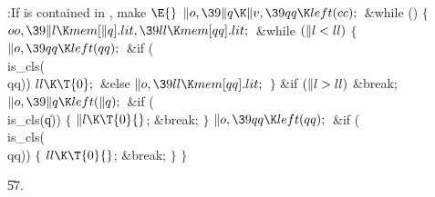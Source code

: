 \Y\B\4:If  is contained in , make %
\X${}\E{}$\6
$\|o,\39\|q\K\|v,\39\\{qq}\K\\{left}(\\{cc});{}$\6
\&{while} ()\5
${}\{{}$\1\6
${}\\{oo},\39\|l\K\\{mem}[\|q].\\{lit},\39\\{ll}\K\\{mem}[\\{qq}].\\{lit};{}$\6
\&{while} ${}(\|l<\\{ll}){}$\5
${}\{{}$\1\6
${}\|o,\39\\{qq}\K\\{left}(\\{qq});{}$\6
\&{if} (\\{is\_cls}(\\{qq}))\1\5
${}\\{ll}\K\T{0};{}$\2\6
\&{else}\1\5
${}\|o,\39\\{ll}\K\\{mem}[\\{qq}].\\{lit};{}$\2\6
\4${}\}{}$\2\6
\&{if} ${}(\|l>\\{ll}){}$\1\5
\&{break};\2\6
${}\|o,\39\|q\K\\{left}(\|q);{}$\6
\&{if} (\\{is\_cls}(\|q))\5
${}\{{}$\1\6
${}\|l\K\T{0}{}$;\5
\&{break};\6
\4${}\}{}$\2\6
${}\|o,\39\\{qq}\K\\{left}(\\{qq});{}$\6
\&{if} (\\{is\_cls}(\\{qq}))\5
${}\{{}$\1\6
${}\\{ll}\K\T{0}{}$;\5
\&{break};\6
\4${}\}{}$\2\6
\4${}\}{}$\2\par
\U57.\fi

